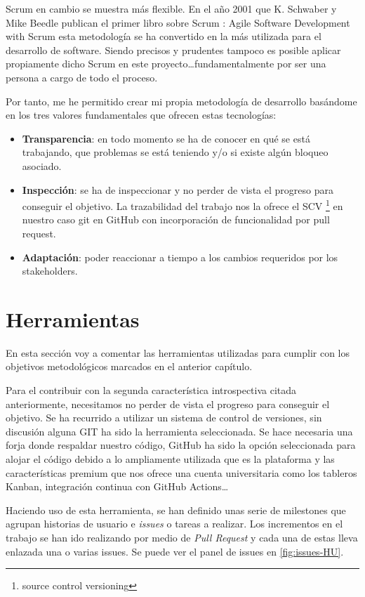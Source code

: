 Scrum en cambio se muestra más flexible. En el año 2001 que K. Schwaber y Mike Beedle
publican el primer libro sobre Scrum \cite{agile_book}: Agile Software Development with
Scrum esta metodología se ha convertido en la más utilizada para el desarrollo de
software. Siendo precisos y prudentes tampoco es posible aplicar propiamente dicho Scrum
en este proyecto\ldots fundamentalmente por ser una persona a cargo de todo el proceso.

Por tanto, me he permitido crear mi propia metodología de desarrollo basándome en los tres
valores fundamentales que ofrecen estas tecnologías:
\begin{itemize}
    \item \textbf{Transparencia}: en todo momento se ha de conocer en qué se está
    trabajando, que problemas se está teniendo y/o si existe algún bloqueo asociado.
    \item \textbf{Inspección}: se ha de inspeccionar y no perder de vista el progreso para
    conseguir el objetivo. La trazabilidad del trabajo nos la ofrece el SCV \footnote{source
    control versioning} en nuestro caso git en GitHub con incorporación de funcionalidad por pull
    request.
    \item \textbf{Adaptación}: poder reaccionar a tiempo a los cambios requeridos por los
    stakeholders.
\end{itemize}


\section{Herramientas}
En esta sección voy a comentar las herramientas utilizadas para cumplir con los objetivos
metodológicos marcados en el anterior capítulo.

Para el contribuir con la segunda característica introspectiva citada anteriormente,
necesitamos no perder de vista el progreso para conseguir el objetivo. Se ha recurrido a
utilizar un sistema de control de versiones, sin discusión alguna GIT ha sido la
herramienta seleccionada. Se hace necesaria una forja donde respaldar nuestro código,
GitHub ha sido la opción seleccionada para alojar el código debido a lo ampliamente
utilizada que es la plataforma y las características premium que nos ofrece una cuenta universitaria como los
tableros Kanban, integración continua con GitHub Actions\ldots

Haciendo uso de esta herramienta, se han definido unas serie de milestones que agrupan
historias de usuario e \textit{issues} o tareas a realizar. Los incrementos en el trabajo se han
ido realizando por medio de \textit{Pull Request} y cada una de estas lleva enlazada una o varias
issues. Se puede ver el panel de issues en \ref{fig:issues-HU}.


